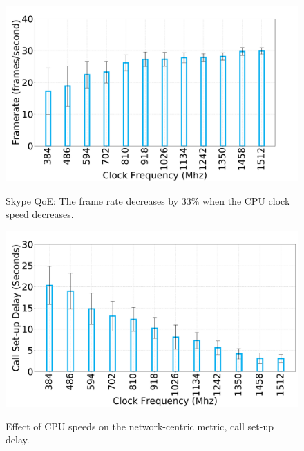 \begin{figure}
\begin{minipage}[t]{.33\textwidth}
   \includegraphics[width=\linewidth]{sections/device-work/skype-fps.pdf}
   \caption{Skype QoE: The frame rate decreases by 33\% when the CPU clock speed decreases.} 
   \vspace{-0.2in}
   \label{fig:skype-framerate}
\end{minipage}
\hspace{0.1in}
\begin{minipage}[t]{.33\textwidth}
   \includegraphics[width=\linewidth]{sections/device-work/skype-call-setup.pdf}
   \caption{Effect of CPU speeds on the network-centric metric, call set-up delay.} 
   \vspace{-0.2in}
   \label{fig:skype-call}
\end{minipage}
\hspace{0.1in}
\begin{minipage}[t]{.33\textwidth}

\end{minipage}
\end{figure}
